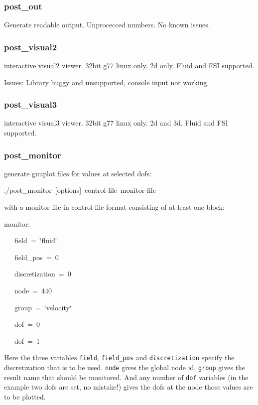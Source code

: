 \subsubsection{post\_out}

Generate readable output. Unprocecced numbers. No known issues.


\subsubsection{post\_visual2}

interactive visual2 viewer. 32bit g77 linux only. 2d only. Fluid and
FSI supported.

Issues: Library buggy and unsupported, console input not working.


\subsubsection{post\_visual3}

interactive visual3 viewer. 32bit g77 linux only. 2d and 3d. Fluid
and FSI supported.


\subsubsection{post\_monitor}

generate gnuplot files for values at selected dofs:

\begin{lyxcode}
./post\_monitor~{[}options]~control-file~monitor-file
\end{lyxcode}
with a monitor-file in control-file format consisting of at least
one block:

\begin{lyxcode}
monitor:

~~~field~=~\char`\"{}fluid\char`\"{}

~~~field\_pos~=~0

~~~discretization~=~0

~~~node~=~440

~~~group~=~\char`\"{}velocity\char`\"{}

~~~dof~=~0

~~~dof~=~1
\end{lyxcode}
Here the three variables \texttt{field}, \texttt{field\_pos} and \texttt{discretization}
specify the discretization that is to be used. \texttt{node} gives
the global node id. \texttt{group} gives the result name that should
be monitored. And any number of \texttt{dof} variables (in the example
two dofs are set, no mistake!) gives the dofs at the node those values
are to be plotted.


